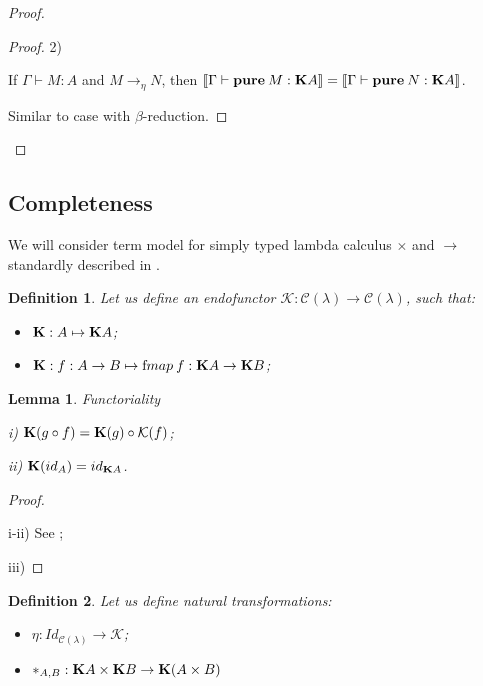 \documentclass[a4paper]{article}
\newtheorem{lemma}{Lemma}
\newtheorem{defin}{Definition}
\begin{document}
\begin{proof}
\begin{proof}
\vspace{\baselineskip}

2)

If $\Gamma \vdash M : A$ and $M \rightarrow_{\eta} N$, then $[\![\Gamma \vdash {\bf pure \:} M : {\bf K}A]\!] = [\![\Gamma \vdash {\bf pure \:} N : {\bf K}A]\!]$.

\vspace{\baselineskip}

Similar to case with $\beta$-reduction.

\end{proof}

\end{proof}

\subsection{Completeness}

We will consider term model for simply typed lambda calculus $\times$ and $\to$ standardly described in \cite{LambekScott} \cite{Abramsky}.

\begin{defin}
  Let us define an endofunctor $\mathcal{K} : \mathcal{C}(\lambda) \to \mathcal{C}(\lambda)$, such that:
  \begin{itemize}
    \item ${\bf K} : A \mapsto {\bf K}A$;
    \item ${\bf K} : f : A \to B \mapsto {\text fmap\: f} : {\bf K} A \to {\bf K} B$;
  \end{itemize}
\end{defin}

\begin{lemma} Functoriality

  i) ${\bf K}(g \circ f) = {\bf K}(g) \circ \mathcal{K}(f)$;

  ii) ${\bf K}(id_A) = id_{{\bf K}A}$.
\end{lemma}

\begin{proof}
  $ $

  i-ii) See \cite{Gabbay};

  iii)
\end{proof}

\begin{defin}

  Let us define natural transformations:
  \begin{itemize}
  \item $\eta : Id_{\mathcal{C}(\lambda)} \to \mathcal{K}$;

  \item $\ast_{A,B} : {\bf K}A \times {\bf K}B \to {\bf K}(A \times B)$
  \end{itemize}
\end{defin}
\end{document}
